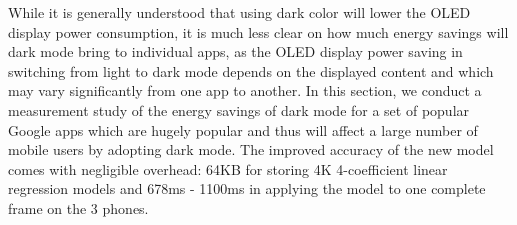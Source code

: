 While it is generally understood that using dark color will lower the OLED
display power consumption, it is much less clear on how much
energy savings will dark mode bring to individual apps, as the
OLED display power saving in switching from light to 
dark mode depends on the displayed content and which may vary
significantly from one app to another. In this section, we conduct a
measurement study of the energy savings of dark mode for a set of
popular Google apps which are hugely popular and thus will affect
a large number of mobile users by adopting dark mode.
The improved accuracy of the new model comes with negligible overhead:
64KB for storing 4K 4-coefficient linear regression models
and 678ms - 1100ms in applying the model to one complete frame on the 3 phones.

\fi
